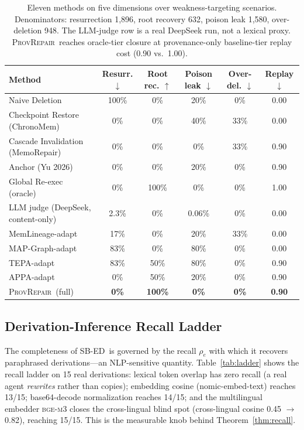 \documentclass[11pt]{article}
\theoremstyle{remark}
\newcommand{\ours}{\textsc{ProvRepair}}
\newcommand{\anchor}{provenance-only baseline}
\newcommand{\sbed}{\textsc{SB-ED}}
\begin{document}
\begin{table}[t]
\centering
\small
\begin{tabular}{lccccc}
\toprule
\textbf{Method} & \textbf{Resurr.} $\downarrow$ & \textbf{Root rec.} $\uparrow$ & \textbf{Poison leak} $\downarrow$ & \textbf{Over-del.} $\downarrow$ & \textbf{Replay} $\downarrow$ \\
\midrule
Naive Deletion & 100\% & 0\% & 20\% & 0\% & 0.00 \\
Checkpoint Restore (ChronoMem) & 0\% & 0\% & 40\% & 33\% & 0.00 \\
Cascade Invalidation (MemoRepair) & 0\% & 0\% & 0\% & 33\% & 0.90 \\
Anchor (Yu 2026) & 0\% & 0\% & 20\% & 0\% & 0.90 \\
Global Re-exec (oracle) & 0\% & 100\% & 0\% & 0\% & 1.00 \\
LLM judge (DeepSeek, content-only) & 2.3\% & 0\% & 0.06\% & 0\% & 0.00 \\
MemLineage-adapt & 17\% & 0\% & 20\% & 33\% & 0.00 \\
MAP-Graph-adapt & 83\% & 0\% & 80\% & 0\% & 0.00 \\
TEPA-adapt & 83\% & 50\% & 80\% & 0\% & 0.90 \\
APPA-adapt & 0\% & 50\% & 20\% & 0\% & 0.90 \\
\ours\ (full) & \textbf{0\%} & \textbf{100\%} & \textbf{0\%} & \textbf{0\%} & \textbf{0.90} \\
\bottomrule
\end{tabular}
\caption{Eleven methods on five dimensions over weakness-targeting scenarios.
Denominators: resurrection 1{,}896, root recovery 632, poison leak 1{,}580,
over-deletion 948. The LLM-judge row is a real DeepSeek run, not a lexical proxy.
\ours\ reaches oracle-tier closure at \anchor-tier replay cost (0.90 vs.\ 1.00).}
\label{tab:baseline}
\end{table}

\subsection{Derivation-Inference Recall Ladder}
\label{sec:recall}

The completeness of \sbed\ is governed by the recall $\rho_e$ with which it recovers
paraphrased derivations---an NLP-sensitive quantity. Table~\ref{tab:ladder} shows the
recall ladder on 15 real derivations: lexical token overlap has zero recall (a real
agent \emph{rewrites} rather than copies); embedding cosine (nomic-embed-text) reaches
13/15; base64-decode normalization reaches 14/15; and the multilingual embedder
\textsc{bge-m3} \citep{chen2024bgem3} closes the cross-lingual blind spot (cross-lingual
cosine 0.45 $\to$
0.82), reaching 15/15. This is the measurable knob behind Theorem~\ref{thm:recall}.
\end{document}
